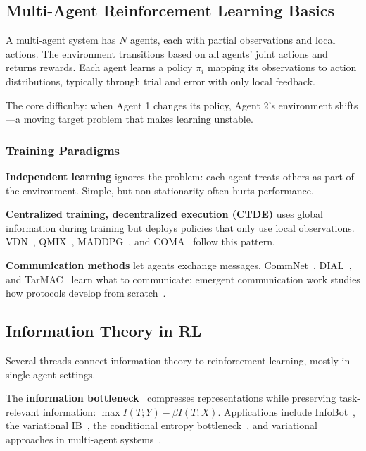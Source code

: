\documentclass[10pt, letterpaper]{article}
\begin{document}
\subsection{Multi-Agent Reinforcement Learning Basics}

A multi-agent system has $N$ agents, each with partial observations and local actions. The environment transitions based on all agents' joint actions and returns rewards. Each agent learns a policy $\pi_i$ mapping its observations to action distributions, typically through trial and error with only local feedback.

The core difficulty: when Agent 1 changes its policy, Agent 2's environment shifts---a moving target problem that makes learning unstable.

\subsubsection*{Training Paradigms}

\textbf{Independent learning} ignores the problem: each agent treats others as part of the environment. Simple, but non-stationarity often hurts performance.

\textbf{Centralized training, decentralized execution (CTDE)} uses global information during training but deploys policies that only use local observations. VDN~\cite{sunehag2018vdn}, QMIX~\cite{rashid2018qmix}, MADDPG~\cite{lowe2017maddpg}, and COMA~\cite{foerster2018coma} follow this pattern.

\textbf{Communication methods} let agents exchange messages. CommNet~\cite{sukhbaatar2016}, DIAL~\cite{foerster2016}, and TarMAC~\cite{das2019tarmac} learn what to communicate; emergent communication work studies how protocols develop from scratch~\cite{lazaridou2017emergent,eccles2019biases}.

\subsection{Information Theory in RL}

Several threads connect information theory to reinforcement learning, mostly in single-agent settings.

The \textbf{information bottleneck}~\cite{tishby2015deep} compresses representations while preserving task-relevant information: $\max I(T;Y) - \beta I(T;X)$. Applications include InfoBot~\cite{goyal2019infobot}, the variational IB~\cite{alemi2017vib}, the conditional entropy bottleneck~\cite{fischer2020ceb}, and variational approaches in multi-agent systems~\cite{igl2019deepvariational}.
\end{document}
